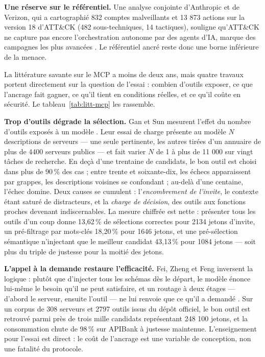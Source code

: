 \textbf{Une réserve sur le référentiel.} Une analyse conjointe d'Anthropic et de Verizon, qui a cartographié 832 comptes malveillants et 13 873 actions sur la version 18 d'ATT\&CK (482 sous-techniques, 14 tactiques), souligne qu'ATT\&CK ne capture pas encore l'orchestration autonome par des agents d'IA, marque des campagnes les plus avancées \cite{anthropicverizon}. Le référentiel ancré reste donc une borne inférieure de la menace.


La littérature savante sur le MCP a moins de deux ans, mais quatre travaux portent directement sur la question de l'essai : combien d'outils exposer, ce que l'ancrage fait gagner, ce qu'il tient en conditions réelles, et ce qu'il coûte en sécurité. Le tableau~\ref{tab:litt-mcp} les rassemble.

\textbf{Trop d'outils dégrade la sélection.} Gan et Sun mesurent l'effet du nombre d'outils exposés à un modèle \cite{ragmcp}. Leur essai de charge présente au modèle $N$ descriptions de serveurs --- une seule pertinente, les autres tirées d'un annuaire de plus de 4400 serveurs publics --- et fait varier $N$ de 1 à plus de 11 000 sur vingt tâches de recherche. En deçà d'une trentaine de candidats, le bon outil est choisi dans plus de 90\,\% des cas ; entre trente et soixante-dix, les échecs apparaissent par grappes, les descriptions voisines se confondant ; au-delà d'une centaine, l'échec domine. Deux causes se cumulent : l'\emph{encombrement de l'invite}, le contexte étant saturé de distracteurs, et la \emph{charge de décision}, des outils aux fonctions proches devenant indiscernables. La mesure chiffrée est nette : présenter tous les outils d'un coup donne 13,62\,\% de sélections correctes pour 2134 jetons d'invite, un pré-filtrage par mots-clés 18,20\,\% pour 1646 jetons, et une pré-sélection sémantique n'injectant que le meilleur candidat 43,13\,\% pour 1084 jetons --- soit plus du triple de justesse pour la moitié des jetons.

\textbf{L'appel à la demande restaure l'efficacité.} Fei, Zheng et Feng inversent la logique : plutôt que d'injecter tous les schémas dès le départ, le modèle énonce lui-même le besoin qu'il ne peut satisfaire, et un routage à deux étages --- d'abord le serveur, ensuite l'outil --- ne lui renvoie que ce qu'il a demandé \cite{mcpzero}. Sur un corpus de 308 serveurs et 2797 outils issus du dépôt officiel, le bon outil est retrouvé parmi près de trois mille candidats représentant 248 100 jetons, et la consommation chute de 98\,\% sur APIBank à justesse maintenue. L'enseignement pour l'essai est direct : le coût de l'ancrage est une variable de conception, non une fatalité du protocole.

